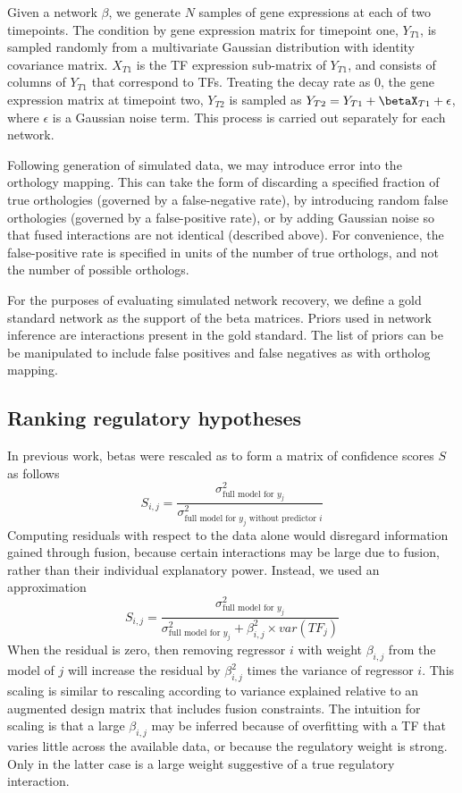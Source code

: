 \documentclass[11pt]{article}
\begin{document}
Given a network $\beta$, we generate $N$ samples of gene expressions at each of two timepoints. The condition by gene expression matrix for timepoint one, $Y_{T1}$, is sampled randomly from a multivariate Gaussian distribution with identity covariance matrix. $X_{T1}$ is the TF expression sub-matrix of $Y_{T1}$, and consists of columns of $Y_{T1}$ that correspond to TFs. Treating the decay rate as 0, the gene expression matrix at timepoint two, $Y_{T2}$ is sampled as $Y_{T2} = Y_{T1} + \betaX_{T1} + \epsilon$, where $\epsilon$ is a Gaussian noise term. This process is carried out separately for each network. 

Following generation of simulated data, we may introduce error into the orthology mapping. This can take the form of discarding a specified fraction of true orthologies (governed by a false-negative rate), by introducing random false orthologies (governed by a false-positive rate), or by adding Gaussian noise so that fused interactions are not identical (described above). For convenience, the false-positive rate is specified in units of the number of true orthologs, and not the number of possible orthologs. 

For the purposes of evaluating simulated network recovery, we define a gold standard network as the support of the beta matrices. Priors used in network inference are interactions present in the gold standard. The list of priors can be be manipulated to include false positives and false negatives as with ortholog mapping. 

\subsection{Ranking regulatory hypotheses}
In previous work, betas were rescaled as to form a matrix of confidence scores $S$ as follows
\begin{equation}
S_{i,j} = \frac{\sigma^2_{\text{full model for }y_j}}{\sigma^2_{\text{full model for }y_j \text{ without predictor }i}}
\end{equation}
Computing residuals with respect to the data alone would disregard information gained through fusion, because certain interactions may be large due to fusion, rather than their individual explanatory power. Instead, we used an approximation
\begin{equation}
S_{i,j} = \frac{\sigma^2_{\text{full model for }y_j}}{\sigma^2_{\text{full model for }y_j} + \beta_{i,j}^2 \times var(TF_j)}
\end{equation}
When the residual is zero, then removing regressor $i$ with weight $\beta_{i,j}$ from the model of $j$ will increase the residual by $\beta_{i,j}^2$ times the variance of regressor $i$. This scaling is similar to rescaling according to variance explained relative to an augmented design matrix that includes fusion constraints. The intuition for scaling is that a large $\beta_{i,j}$ may be inferred because of overfitting with a TF that varies little across the available data, or because the regulatory weight is strong. Only in the latter case is a large weight suggestive of a true regulatory interaction.
\end{document}
